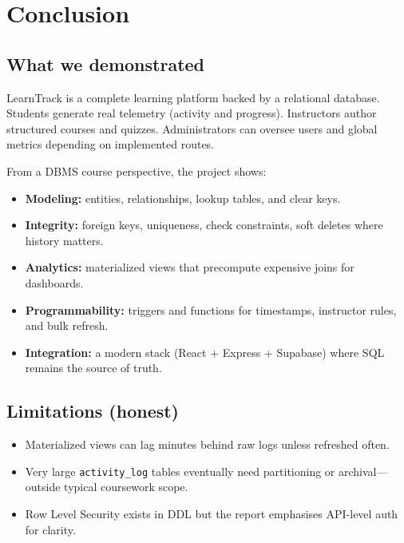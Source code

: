 
\chapter{Conclusion}
\label{ch:conclusion}

\section{What we demonstrated}
LearnTrack is a complete learning platform backed by a relational database. Students generate real telemetry (activity and progress). Instructors author structured courses and quizzes. Administrators can oversee users and global metrics depending on implemented routes.

From a DBMS course perspective, the project shows:

\begin{itemize}[leftmargin=*]
  \item \textbf{Modeling:} entities, relationships, lookup tables, and clear keys.

  \item \textbf{Integrity:} foreign keys, uniqueness, check constraints, soft deletes where history matters.

  \item \textbf{Analytics:} materialized views that precompute expensive joins for dashboards.

  \item \textbf{Programmability:} triggers and functions for timestamps, instructor rules, and bulk refresh.

  \item \textbf{Integration:} a modern stack (React + Express + Supabase) where SQL remains the source of truth.

\end{itemize}

\section{Limitations (honest)}
\begin{itemize}[leftmargin=*]
  \item Materialized views can lag minutes behind raw logs unless refreshed often.

  \item Very large \texttt{activity\_log} tables eventually need partitioning or archival---outside typical coursework scope.

  \item Row Level Security exists in DDL but the report emphasises API-level auth for clarity.

\end{itemize}

